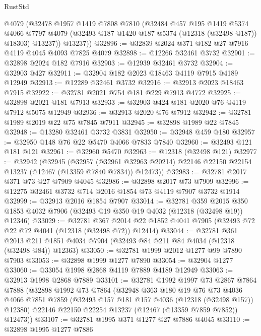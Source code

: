 \begin{lexlean}{RustStd}
\begin{coremodule}
        @4079
        (@32478
          @1957
          @1419
          @7808
          @7810
          (@32484
            @457
            @195
            @1419
            @5374
            @4066
            @7797
            @4079
            (@32493 @187 @1420 @187 @5374 (@12318 (@32498 @187)) @18303)
            @13237))
        @13237))
@32896 := @32839 @2024 @371 @182 @27 @7916 @4119 @4045 @4093 @7825 @4079
@32898 := @12266 @32461 @3732
@32901 := @32898 @2024 @182 @7916
@32903 := @12939 @32461 @3732
@32904 := @32903 @427
@32911 := @32904 @182 @2023 @18463 @4119 @7915 @4189 @12949
@32913 := @12289 @32461 @3732
@32916 := @32913 @2023 @18463 @7915
@32922 := @32781 @2021 @754 @181 @229 @7913 @4772
@32925 := @32898 @2021 @181 @7913
@32933 := @32903 @424 @181 @2020 @76 @4119 @7912 @5075 @12949
@32936 := @32913 @2020 @76 @7912
@32942 := @32781 @1989 @2019 @22 @75 @7845 @7911
@32945 := @32898 @1989 @22 @7845
@32948 := @13280 @32461 @3732 @3831
@32950 := @32948 @459 @180
@32957 := @32950 @148 @76 @22 @5470 @4066 @7833 @7840
@32960 := @32493 @121 @181 @121
@32961 := @32960 @5470
@32963 := @12318 (@32498 @121)
@32977 := @32942
    (@32945
      (@32957
        (@32961 @32963 @20214)
        @22146
        @22150
        @22154
        @13237
        (@12467 (@13359 @7840 @7834))
        @12473))
@32983 := @32781 @2017 @371 @73 @27 @7909 @4045
@32986 := @32898 @2017 @73 @7909
@32996 := @12275 @32461 @3732 @714 @2016 @1854 @73 @4119 @7907 @3732 @1914
@32999 := @32913 @2016 @1854 @7907
@33014 := @32781
    @359
    @2015
    @350
    @1853
    @4032
    @7906
    (@32493 @19 @350 @19 @4032 (@12318 (@32498 @19)) @12346)
@33029 := @32781
    @367
    @2014
    @22
    @1852
    @4041
    @7905
    (@32493 @72 @22 @72 @4041 (@12318 (@32498 @72)) @12414)
@33044 := @32781
    @361
    @2013
    @211
    @1851
    @4034
    @7904
    (@32493 @84 @211 @84 @4034 (@12318 (@32498 @84)) @12363)
@33050 := @32781 @1999 @2012 @1277 @99 @7890 @7903
@33053 := @32898 @1999 @1277 @7890
@33054 := @32904 @1277
@33060 := @33054 @1998 @2868 @4119 @7889 @4189 @12949
@33063 := @32913 @1998 @2868 @7889
@33101 := @32781
    @1992
    @1997
    @73
    @2867
    @7864
    @7888
    (@32898
      @1992
      @73
      @7864
      (@32948
        @363
        @180
        @19
        @76
        @73
        @4036
        @4066
        @7851
        @7859
        (@32493 @157 @181 @157 @4036 (@12318 (@32498 @157)) @12380)
        @22146
        @22150
        @22254
        @13237
        (@12467 (@13359 @7859 @7852))
        @12473))
@33107 := @32781 @1995 @371 @1277 @27 @7886 @4045
@33110 := @32898 @1995 @1277 @7886

\end{coremodule}
\end{lexlean}
